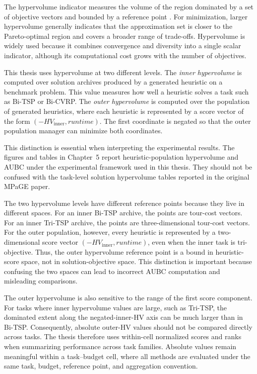 The hypervolume indicator measures the volume of the region dominated by a set of objective vectors and bounded by a reference point \cite{zitzler1999multiobjective,fonseca2006hv}. For minimization, larger hypervolume generally indicates that the approximation set is closer to the Pareto-optimal region and covers a broader range of trade-offs. Hypervolume is widely used because it combines convergence and diversity into a single scalar indicator, although its computational cost grows with the number of objectives.

This thesis uses hypervolume at two different levels. The \emph{inner hypervolume} is computed over solution archives produced by a generated heuristic on a benchmark problem. This value measures how well a heuristic solves a task such as Bi-TSP or Bi-CVRP. The \emph{outer hypervolume} is computed over the population of generated heuristics, where each heuristic is represented by a score vector of the form $(-HV_{\text{inner}}, runtime)$. The first coordinate is negated so that the outer population manager can minimize both coordinates.

This distinction is essential when interpreting the experimental results. The figures and tables in Chapter~5 report heuristic-population hypervolume and AUBC under the experimental framework used in this thesis. They should not be confused with the task-level solution hypervolume tables reported in the original MPaGE paper.

The two hypervolume levels have different reference points because they live in different spaces. For an inner Bi-TSP archive, the points are tour-cost vectors. For an inner Tri-TSP archive, the points are three-dimensional tour-cost vectors. For the outer population, however, every heuristic is represented by a two-dimensional score vector $(-HV_{\mathrm{inner}}, runtime)$, even when the inner task is tri-objective. Thus, the outer hypervolume reference point is a bound in heuristic-score space, not in solution-objective space. This distinction is important because confusing the two spaces can lead to incorrect AUBC computation and misleading comparisons.

The outer hypervolume is also sensitive to the range of the first score component. For tasks where inner hypervolume values are large, such as Tri-TSP, the dominated extent along the negated-inner-HV axis can be much larger than in Bi-TSP. Consequently, absolute outer-HV values should not be compared directly across tasks. The thesis therefore uses within-cell normalized scores and ranks when summarizing performance across task families. Absolute values remain meaningful within a task--budget cell, where all methods are evaluated under the same task, budget, reference point, and aggregation convention.

